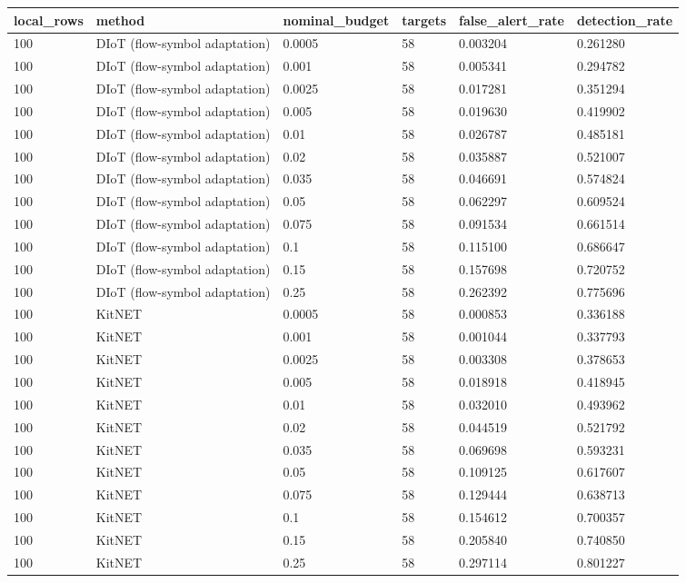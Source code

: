 \begin{tabular}{llllll}
\toprule
local\_rows & method & nominal\_budget & targets & false\_alert\_rate & detection\_rate \\
\midrule
100 & DIoT (flow-symbol adaptation) & 0.0005 & 58 & 0.003204 & 0.261280 \\
100 & DIoT (flow-symbol adaptation) & 0.001 & 58 & 0.005341 & 0.294782 \\
100 & DIoT (flow-symbol adaptation) & 0.0025 & 58 & 0.017281 & 0.351294 \\
100 & DIoT (flow-symbol adaptation) & 0.005 & 58 & 0.019630 & 0.419902 \\
100 & DIoT (flow-symbol adaptation) & 0.01 & 58 & 0.026787 & 0.485181 \\
100 & DIoT (flow-symbol adaptation) & 0.02 & 58 & 0.035887 & 0.521007 \\
100 & DIoT (flow-symbol adaptation) & 0.035 & 58 & 0.046691 & 0.574824 \\
100 & DIoT (flow-symbol adaptation) & 0.05 & 58 & 0.062297 & 0.609524 \\
100 & DIoT (flow-symbol adaptation) & 0.075 & 58 & 0.091534 & 0.661514 \\
100 & DIoT (flow-symbol adaptation) & 0.1 & 58 & 0.115100 & 0.686647 \\
100 & DIoT (flow-symbol adaptation) & 0.15 & 58 & 0.157698 & 0.720752 \\
100 & DIoT (flow-symbol adaptation) & 0.25 & 58 & 0.262392 & 0.775696 \\
100 & KitNET & 0.0005 & 58 & 0.000853 & 0.336188 \\
100 & KitNET & 0.001 & 58 & 0.001044 & 0.337793 \\
100 & KitNET & 0.0025 & 58 & 0.003308 & 0.378653 \\
100 & KitNET & 0.005 & 58 & 0.018918 & 0.418945 \\
100 & KitNET & 0.01 & 58 & 0.032010 & 0.493962 \\
100 & KitNET & 0.02 & 58 & 0.044519 & 0.521792 \\
100 & KitNET & 0.035 & 58 & 0.069698 & 0.593231 \\
100 & KitNET & 0.05 & 58 & 0.109125 & 0.617607 \\
100 & KitNET & 0.075 & 58 & 0.129444 & 0.638713 \\
100 & KitNET & 0.1 & 58 & 0.154612 & 0.700357 \\
100 & KitNET & 0.15 & 58 & 0.205840 & 0.740850 \\
100 & KitNET & 0.25 & 58 & 0.297114 & 0.801227 \\

\end{tabular}
